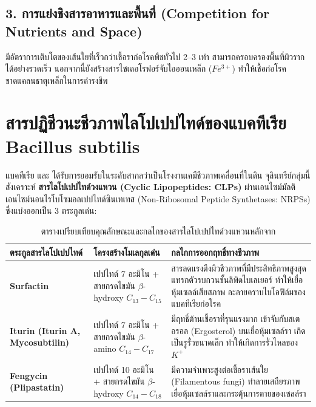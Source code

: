 \subsection{3. การแย่งชิงสารอาหารและพื้นที่ (Competition for Nutrients and Space)}
 มีอัตราการเติบโตของเส้นใยที่เร็วกว่าเชื้อราก่อโรคพืชทั่วไป 2--3 เท่า สามารถครอบครองพื้นที่ผิวรากได้อย่างรวดเร็ว นอกจากนี้ยังสร้างสารไซเดอโรฟอร์จับไอออนเหล็ก ($Fe^{3+}$) ทำให้เชื้อก่อโรคขาดแคลนธาตุเหล็กในการดำรงชีพ

\section{สารปฏิชีวนะชีวภาพไลโปเปปไทด์ของแบคทีเรีย Bacillus subtilis}

แบคทีเรีย  และ  ได้รับการยอมรับในระดับสากลว่าเป็นโรงงานเคมีชีวภาพเคลื่อนที่ในดิน จุลินทรีย์กลุ่มนี้สังเคราะห์ \textbf{สารไลโปเปปไทด์วงแหวน (Cyclic Lipopeptides: CLPs)} ผ่านเอนไซม์มัลติเอนไซม์นอนไรโบโซมอลเปปไทด์ซินเทเทส (Non-Ribosomal Peptide Synthetases: NRPSs) ซึ่งแบ่งออกเป็น 3 ตระกูลเด่น:

\begin{table}[ht]
\centering
\small
\setlength{\tabcolsep}{4pt}
\begin{tabular}{p{2.3cm}p{4.2cm}p{5.5cm}}
\toprule
\textbf{ตระกูลสารไลโปเปปไทด์} & \textbf{โครงสร้างโมเลกุลเด่น} & \textbf{กลไกการออกฤทธิ์ทางชีวภาพ} \\
\midrule
\textbf{Surfactin\index{Surfactin}} & เปปไทด์ 7 อะมิโน + สายกรดไขมัน $\beta$-hydroxy $C_{13}-C_{15}$ & สารลดแรงตึงผิวชีวภาพที่มีประสิทธิภาพสูงสุด แทรกตัวรบกวนชั้นลิพิดไบเลเยอร์ ทำให้เยื่อหุ้มเซลล์เสียสภาพ ละลายคราบไบโอฟิล์มของแบคทีเรียก่อโรค \\
\textbf{Iturin (Iturin A, Mycosubtilin)\index{Iturin}} & เปปไทด์ 7 อะมิโน + สายกรดไขมัน $\beta$-amino $C_{14}-C_{17}$ & มีฤทธิ์ต้านเชื้อราที่รุนแรงมาก เข้าจับกับสเตอรอล (Ergosterol) บนเยื่อหุ้มเซลล์รา เกิดเป็นรูรั่วขนาดเล็ก ทำให้เกิดการรั่วไหลของ $K^+$ \\
\textbf{Fengycin (Plipastatin)\index{Fengycin}} & เปปไทด์ 10 อะมิโน + สายกรดไขมัน $\beta$-hydroxy $C_{14}-C_{18}$ & มีความจำเพาะสูงต่อเชื้อราเส้นใย (Filamentous fungi) ทำลายเสถียรภาพเยื่อหุ้มเซลล์ราและกระตุ้นการตายของเซลล์รา \\
\bottomrule
\end{tabular}
\caption{ตารางเปรียบเทียบคุณลักษณะและกลไกของสารไลโปเปปไทด์วงแหวนหลักจาก }
\label{tab:bacillus_lipopeptides}
\end{table}

